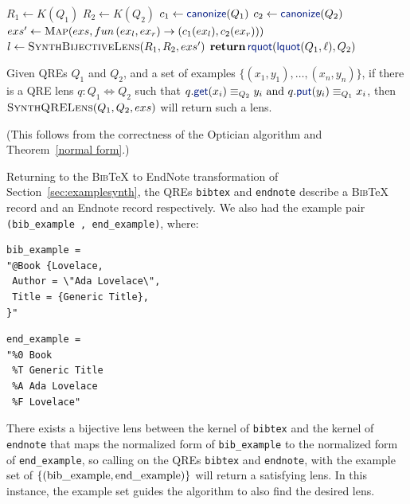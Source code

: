 \documentclass[acmsmall,review,anonymous]{acmart}
\newcommand{\kw}[1]{\textcolor{dkblue}{\ensuremath{\mathsf{#1}}}}
\newcommand{\canonize}{\ensuremath{\kw{canonize}}}
\newcommand{\bibtex}{\textsc{Bib}\TeX{}}
\newcommand{\get}{\ensuremath{\kw{get}}}
\newcommand{\lput}{\ensuremath{\kw{put}}}
\newcommand{\lquot}{\ensuremath{\kw{lquot}}}
\newcommand{\rquot}{\ensuremath{\kw{rquot}}}
\newcommand{\cd}[1]{\lstinline[backgroundcolor=\color{white}]$#1$}
\begin{document}
\begin{algorithm}
  \caption{}
  \label{alg:synthqrelens}
  \begin{algorithmic}[1]
    \State $R_1 \gets K(Q_1)$
    \State $R_2 \gets K(Q_2)$
    \State $c_1 \gets \canonize(Q_1)$
    \State $c_2 \gets \canonize(Q_2)$
    \State $exs' \gets \Call{Map}{exs,fun \, (ex_l,ex_r) \to
      (c_1(ex_l),c_2(ex_r))}$
    \State $l \gets \Call{SynthBijectiveLens}{R_1,R_2,exs'}$
    \State $\Return \, \rquot(\lquot(Q_1, \ell), Q_2)$
    \EndFunction
  \end{algorithmic}
\end{algorithm}

\noindent
\begin{theorem}\label{thm:alg-correct}
  Given QREs $Q_1$ and $Q_2$, and a set of examples
  $\{(x_1,y_1),\ldots,(x_n,y_n)\}$, if there is a QRE lens $q : Q_1
  \Leftrightarrow Q_2$ such that $q.\get(x_i) \equiv_{Q_2} y_i \text{ and }
q.\lput(y_i) \equiv_{Q_1} x_i$, then $\textproc{SynthQRELens}(Q_1,Q_2,exs)$ will
return such a lens.
\end{theorem}

\noindent
(This follows from the correctness of the Optician algorithm and
Theorem~\ref{normal form}.)

Returning to the \bibtex{} to EndNote transformation of
Section~\ref{sec:examplesynth}, the QREs \cd{bibtex} and \cd{endnote}
describe a \bibtex{} record and an Endnote record respectively. We also had
the example pair \cd{(bib_example , end_example)}, where:
\begin{center}
\begin{minipage}{2.5in}
\begin{lstlisting}
bib_example =
"@Book {Lovelace,
 Author = \"Ada Lovelace\",
 Title = {Generic Title},
}"
\end{lstlisting}
\end{minipage}
\begin{minipage}{1.5in}
\begin{lstlisting}
end_example =
"%0 Book
 %T Generic Title
 %A Ada Lovelace
 %F Lovelace"
\end{lstlisting}
\end{minipage}
\end{center}
There exists a bijective lens between the kernel of \cd{bibtex} and the kernel
of \cd{endnote} that maps the normalized form of \cd{bib_example} to the
normalized form of \cd{end_example}, so calling  on the
QREs \cd{bibtex} and \cd{endnote}, with the example set of
$\{(\text{\cd{bib\_example}},\text{\cd{end\_example}})\}$ will return a
satisfying lens. In this instance, the example set guides the algorithm to also
find the desired lens.
\end{document}
